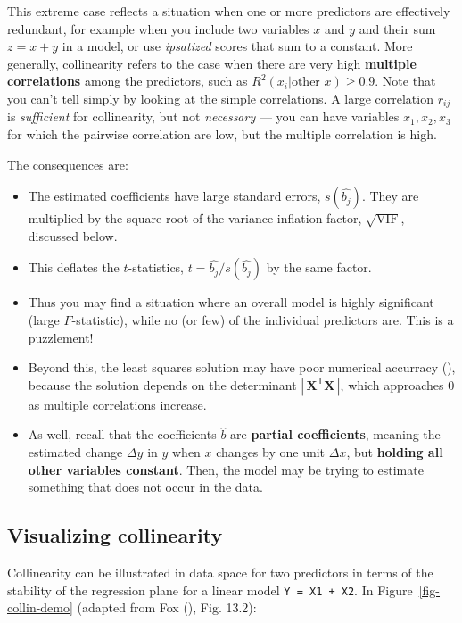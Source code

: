 \documentclass[
  letterpaper,
  10pt,
  krantz2]{krantz}
\providecommand{\tightlist}{%
  \setlength{\itemsep}{0pt}\setlength{\parskip}{0pt}}\usepackage{longtable,booktabs,array}
\begin{document}
{This extreme case reflects a situation when one or more predictors are
effectively redundant, for example when you include two variables \(x\)
and \(y\) and their sum \(z = x + y\) in a model, or use
\emph{ipsatized} scores that sum to a constant. More generally,
collinearity refers to the case when there are very high
\textbf{multiple correlations} among the predictors, such as
\(R^2 (x_i | \text{other }x) \ge 0.9\). Note that you can't tell simply
by looking at the simple correlations. A large correlation \(r_{ij}\) is
\emph{sufficient} for collinearity, but not \emph{necessary} --- you can
have variables \(x_1, x_2, x_3\) for which the pairwise correlation are
low, but the multiple correlation is high.

The consequences are:

\begin{itemize}
\tightlist
\item
  The estimated coefficients have large standard errors,
  \(s(\hat{b_j})\). They are multiplied by the square root of the
  variance inflation factor, \(\sqrt{\text{VIF}}\), discussed below.
\item
  This deflates the \(t\)-statistics, \(t = \hat{b_j} / s(\hat{b_j})\)
  by the same factor.
\item
  Thus you may find a situation where an overall model is highly
  significant (large \(F\)-statistic), while no (or few) of the
  individual predictors are. This is a puzzlement!
\item
  Beyond this, the least squares solution may have poor numerical
  accurracy (), because the
  solution depends on the determinant
  \(|\,\mathbf{X}^\textsf{T} \mathbf{X}\,|\), which approaches 0 as
  multiple correlations increase.
\item
  As well, recall that the coefficients \(\hat{b}\) are \textbf{partial
  coefficients}, meaning the estimated change \(\Delta y\) in \(y\) when
  \(x\) changes by one unit \(\Delta x\), but \textbf{holding all other
  variables constant}. Then, the model may be trying to estimate
  something that does not occur in the data.
\end{itemize}

\subsection{Visualizing collinearity}\label{visualizing-collinearity}

Collinearity can be illustrated in data space for two predictors in
terms of the stability of the regression plane for a linear model
\texttt{Y\ =\ X1\ +\ X2}. In Figure~\ref{fig-collin-demo} (adapted from
Fox (), Fig. 13.2):

}
\end{document}
